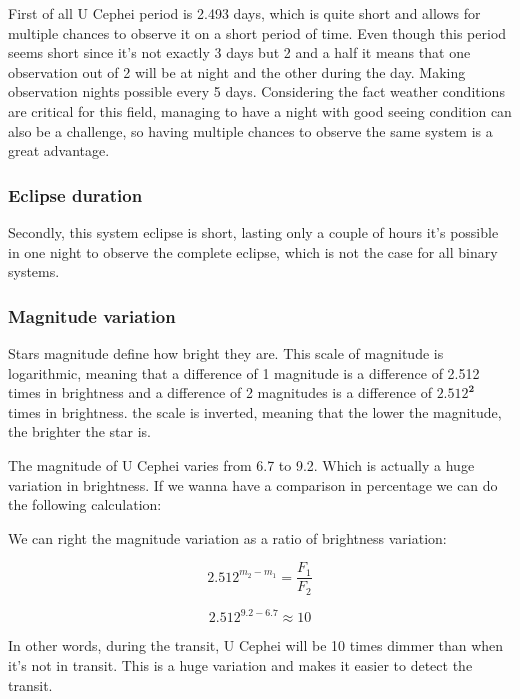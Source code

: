 \documentclass[12pt,a4paper]{article}
\begin{document}
First of all U Cephei period is 2.493 days, which is quite short and allows for multiple chances to observe it on a short period of time. 
Even though this period seems short since it's not exactly 3 days but 2 and a half it means that one observation out of 2 will be at night and the other during the day.
Making observation nights possible every 5 days.
Considering the fact weather conditions are critical for this field, managing to have a night with good seeing condition can also be a challenge, so having multiple chances to observe the same system is a great advantage.

\subsubsection{Eclipse duration}

Secondly, this system eclipse is short, lasting only a couple of hours it's possible in one night to observe the complete eclipse, which is not the case for all binary systems.

\subsubsection{Magnitude variation}

Stars magnitude define how bright they are. This scale of magnitude is logarithmic, meaning that a difference of 1 magnitude is a difference of 2.512 times in brightness and a difference of 2 magnitudes is a difference of \(\mathbf{2.512^2}\) times in brightness.
the scale is inverted, meaning that the lower the magnitude, the brighter the star is.

The magnitude of U Cephei varies from 6.7 to 9.2. Which is actually a huge variation in brightness. If we wanna have a comparison in percentage we can do the following calculation:

We can right the magnitude variation as a ratio of brightness variation:

\begin{equation}
     2.512^{m_2-m_1} = \frac{F_1}{F_2}
\end{equation}

\begin{equation}
    2.512^{9.2-6.7} \approx 10
\end{equation}

In other words, during the transit, U Cephei will be 10 times dimmer than when it's not in transit. This is a huge variation and makes it easier to detect the transit.
\end{document}
